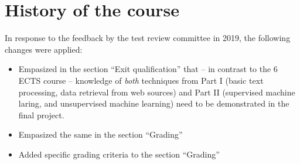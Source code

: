 \documentclass[a4paper,12pt]{report}
\begin{document}
\chapter{History of the course}
In response to the feedback by the test review committee in 2019, the following changes were applied:
\begin{itemize}
\item Empasized in the section ``Exit qualification'' that -- in contrast to the 6 ECTS course -- knowledge of \emph{both} techniques from Part I (basic text processing, data retrieval from web sources) and Part II (supervised machine laring, and unsupervised machine learning) need to be demonstrated in the final project.
\item Empasized the same in the section ``Grading''
\item Added specific grading criteria to the section ``Grading''
\end{itemize}


 



 
 
 
\end{document}
